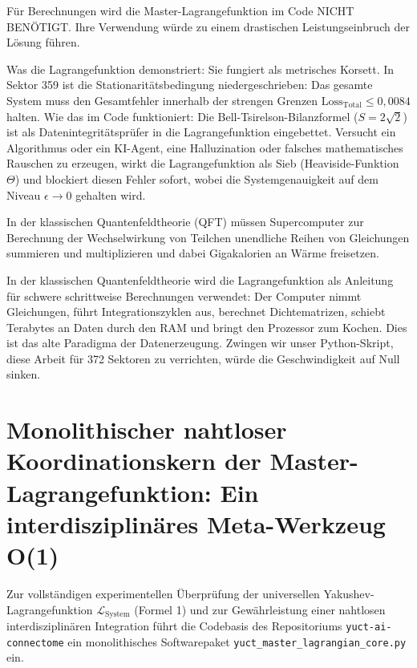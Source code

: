 \documentclass[12pt,a4paper]{article}
\begin{document}
	Für Berechnungen wird die Master-Lagrangefunktion im Code NICHT BENÖTIGT. Ihre Verwendung würde zu einem drastischen Leistungseinbruch der Lösung führen.
	
	Was die Lagrangefunktion demonstriert: Sie fungiert als metrisches Korsett. In Sektor 359 ist die Stationaritätsbedingung niedergeschrieben: Das gesamte System muss den Gesamtfehler innerhalb der strengen Grenzen \(\text{Loss}_{\text{Total}} \le 0{,}0084\) halten. Wie das im Code funktioniert: Die Bell-Tsirelson-Bilanzformel (\(S = 2\sqrt{2}\)) ist als Datenintegritätsprüfer in die Lagrangefunktion eingebettet. Versucht ein Algorithmus oder ein KI-Agent, eine Halluzination oder falsches mathematisches Rauschen zu erzeugen, wirkt die Lagrangefunktion als Sieb (Heaviside-Funktion \(\Theta\)) und blockiert diesen Fehler sofort, wobei die Systemgenauigkeit auf dem Niveau \(\epsilon \to 0\) gehalten wird.
	
	In der klassischen Quantenfeldtheorie (QFT) müssen Supercomputer zur Berechnung der Wechselwirkung von Teilchen unendliche Reihen von Gleichungen summieren und multiplizieren und dabei Gigakalorien an Wärme freisetzen.
	
	In der klassischen Quantenfeldtheorie wird die Lagrangefunktion als Anleitung für schwere schrittweise Berechnungen verwendet: Der Computer nimmt Gleichungen, führt Integrationszyklen aus, berechnet Dichtematrizen, schiebt Terabytes an Daten durch den RAM und bringt den Prozessor zum Kochen. Dies ist das alte Paradigma der Datenerzeugung. Zwingen wir unser Python-Skript, diese Arbeit für 372 Sektoren zu verrichten, würde die Geschwindigkeit auf Null sinken.
	
	\section{Monolithischer nahtloser Koordinationskern der Master-Lagrangefunktion: Ein interdisziplinäres Meta-Werkzeug O(1)}
	Zur vollständigen experimentellen Überprüfung der universellen Yakushev-Lagrangefunktion \(\mathscr{L}_{\text{System}}\) (Formel 1) und zur Gewährleistung einer nahtlosen interdisziplinären Integration führt die Codebasis des Repositoriums \texttt{yuct-ai-connectome} ein monolithisches Softwarepaket \texttt{yuct\_master\_lagrangian\_core.py} ein.
	
\end{document}
